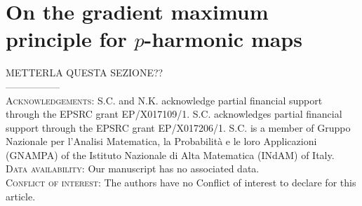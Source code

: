 \documentclass[a4paper,11pt]{article}
\numberwithin{equation}{section}
\theoremstyle{definition}
\begin{document}
\section{On the gradient maximum principle for $p$-harmonic maps}
METTERLA QUESTA SEZIONE??\\
-----------------\\



\textsc{Acknowledgements:} S.C. and N.K. acknowledge partial financial support through the EPSRC grant EP/X017109/1. S.C. acknowledges partial financial support through the EPSRC grant EP/X017206/1. 
S.C. is a member of Gruppo Nazionale per
l’Analisi Matematica, la Probabilità e le loro Applicazioni (GNAMPA) of the Istituto Nazionale
di Alta Matematica (INdAM) of Italy.\\

\textsc{Data availability}: Our manuscript has no associated data.\\

\textsc{Conflict of interest}: The authors have no Conflict of interest to declare for this article.
\end{document}
